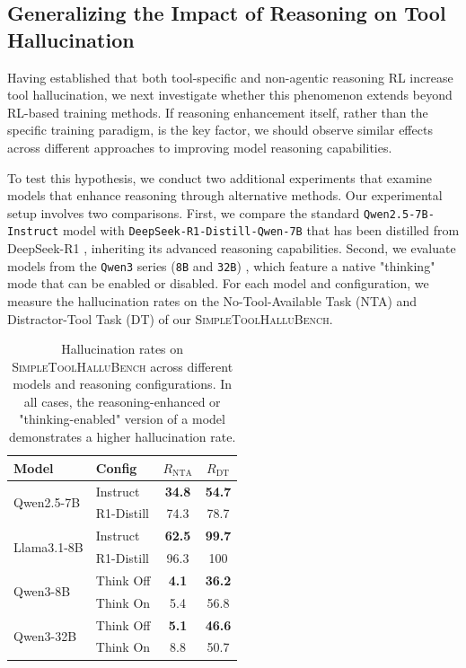 \documentclass[11pt]{article}
\begin{document}
\subsection{Generalizing the Impact of Reasoning on Tool Hallucination}
\label{general}

Having established that both tool-specific and non-agentic reasoning RL increase tool hallucination, we next investigate whether this phenomenon extends beyond RL-based training methods. If reasoning enhancement itself, rather than the specific training paradigm, is the key factor, we should observe similar effects across different approaches to improving model reasoning capabilities.

To test this hypothesis, we conduct two additional experiments that examine models that enhance reasoning through alternative methods. Our experimental setup involves two comparisons. First, we compare the standard \texttt{Qwen2.5-7B-Instruct} model with \texttt{DeepSeek-R1-Distill-Qwen-7B} that has been distilled from DeepSeek-R1 \citep{guo2025deepseekrl}, inheriting its advanced reasoning capabilities. Second, we evaluate models from the \texttt{Qwen3} series (\texttt{8B} and \texttt{32B}) \citep{yang2025qwen3}, which feature a native "thinking" mode that can be enabled or disabled. For each model and configuration, we measure the hallucination rates on the No-Tool-Available Task (NTA) and Distractor-Tool Task (DT) of our \textsc{SimpleToolHalluBench}.

\begin{table}[h]
\centering
\caption{Hallucination rates on \textsc{SimpleToolHalluBench} across different models and reasoning configurations. In all cases, the reasoning-enhanced or "thinking-enabled" version of a model demonstrates a higher hallucination rate.}
\label{tab:broader_impact}
\begin{tabular}{llcc}
\toprule
\textbf{Model} & \textbf{Config} & \textbf{$R_{\text{NTA}}$} & \textbf{$R_{\text{DT}}$} \\
\midrule
\multirow{2}{*}{Qwen2.5-7B} & Instruct & \textbf{34.8} & \textbf{54.7} \\
 & R1-Distill & 74.3 & 78.7 \\
\midrule
\multirow{2}{*}{Llama3.1-8B} & Instruct & \textbf{62.5} & \textbf{99.7} \\
 & R1-Distill & 96.3 & 100 \\
\midrule
\multirow{2}{*}{Qwen3-8B} & Think Off & \textbf{4.1} & \textbf{36.2} \\
 & Think On & 5.4 & 56.8 \\
\midrule
\multirow{2}{*}{Qwen3-32B} & Think Off & \textbf{5.1} & \textbf{46.6} \\
 & Think On & 8.8 & 50.7 \\
\bottomrule
\end{tabular}
\end{table}
\end{document}
